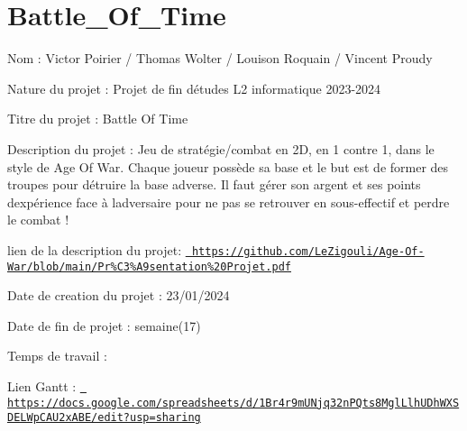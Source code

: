 \chapter{Battle\+\_\+\+Of\+\_\+\+Time}
\hypertarget{md__2_users_2vic_2_documents_2_battle___of___time_2_r_e_a_d_m_e}{}\label{md__2_users_2vic_2_documents_2_battle___of___time_2_r_e_a_d_m_e}
\label{md__2_users_2vic_2_documents_2_battle___of___time_2_r_e_a_d_m_e_autotoc_md0}%
%
 Nom \+: Victor Poirier / Thomas Wolter / Louison Roquain / Vincent Proudy

Nature du projet \+: Projet de fin d\textquotesingle{}études L2 informatique 2023-\/2024

Titre du projet \+: Battle Of Time

Description du projet \+: Jeu de stratégie/combat en 2D, en 1 contre 1, dans le style de Age Of War. Chaque joueur possède sa base et le but est de former des troupes pour détruire la base adverse. Il faut gérer son argent et ses points d\textquotesingle{}expérience face à l\textquotesingle{}adversaire pour ne pas se retrouver en sous-\/effectif et perdre le combat !

lien de la description du projet\+: \href{https://github.com/LeZigouli/Age-Of-War/blob/main/Pr\%C3\%A9sentation\%20Projet.pdf}{\texttt{ https\+://github.\+com/\+Le\+Zigouli/\+Age-\/\+Of-\/\+War/blob/main/\+Pr\%\+C3\%\+A9sentation\%20\+Projet.\+pdf}}

Date de creation du projet \+: 23/01/2024

Date de fin de projet \+: semaine(17)

Temps de travail \+:

Lien Gantt \+: \href{https://docs.google.com/spreadsheets/d/1Br4r9mUNjq32nPQts8MglLlhUDhWXSDELWpCAU2xABE/edit?usp=sharing}{\texttt{ https\+://docs.\+google.\+com/spreadsheets/d/1\+Br4r9m\+UNjq32n\+PQts8\+Mgl\+Llh\+UDh\+WXSDELWp\+CAU2x\+ABE/edit?usp=sharing}} 